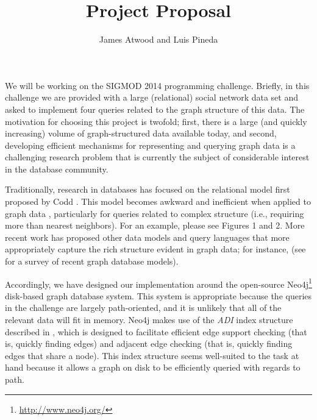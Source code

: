 \documentclass{article}
\title{Project Proposal}
\author{
James Atwood and Luis Pineda \\ %
}
\begin{document}
\maketitle

We will be working on the SIGMOD 2014 programming challenge.  Briefly,
in this challenge we are provided with a large (relational) social
network data set and asked to implement four queries related to the
graph structure of this data.  The motivation for choosing this
project is twofold; first, there is a large (and quickly increasing)
volume of graph-structured data available today, and second,
developing efficient mechanisms for representing and querying graph
data is a challenging research problem that is currently the subject
of considerable interest in the database community.

Traditionally, research in databases has focused on the relational
model first proposed by Codd \cite{codd1970relational}.  This model
becomes awkward and inefficient when applied to graph data
\cite{rodriguez2011graph}, particularly for queries related to
complex structure (i.e., requiring more than nearest neighbors).  For
an example, please see \cite{he2008graphs} Figures 1 and 2.  More
recent work has proposed other data models and query languages that
more appropriately capture the rich structure evident in graph data;
for instance,
\cite{he2008graphs,sun2012efficient,low2010graphlab} (see
\cite{angles2008survey} for a survey of recent graph database
models).  


Accordingly, we have designed our implementation around the open-source
Neo4j\footnote{\url{http://www.neo4j.org/}} disk-based graph database
system.  This system is appropriate because the queries in the
challenge are largely path-oriented, and it is unlikely that all of
the relevant data will fit in memory.  Neo4j makes use of the
\emph{ADI} index structure \cite[Chapter~6]{IanRobinson:2013ul} described in \cite{wang2004scalable}, which
is designed to facilitate efficient edge support checking (that is,
quickly finding edges) and adjacent edge checking (that is, quickly
finding edges that share a node).
This index structure seems well-suited to the task at hand because it
allows a graph on disk to be efficiently queried with regards to path.
\end{document}
